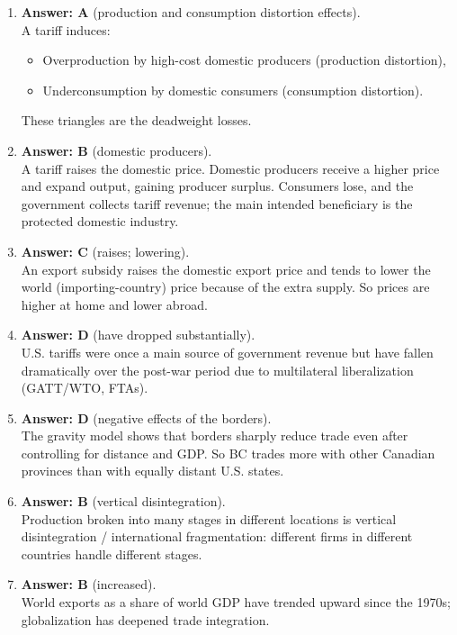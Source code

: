 \documentclass[12pt]{article}
\begin{document}
\begin{enumerate}[label=\textbf{\arabic*.}]
\item \textbf{Answer: A} (production and consumption distortion effects).\\
A tariff induces:
\begin{itemize}
\item Overproduction by high-cost domestic producers (production distortion),
\item Underconsumption by domestic consumers (consumption distortion).
\end{itemize}
These triangles are the deadweight losses.

\item \textbf{Answer: B} (domestic producers).\\
A tariff raises the domestic price. Domestic producers receive a higher price and expand output, gaining producer surplus. Consumers lose, and the government collects tariff revenue; the main intended beneficiary is the protected domestic industry.

\item \textbf{Answer: C} (raises; lowering).\\
An export subsidy raises the domestic export price and tends to lower the world (importing-country) price because of the extra supply. So prices are higher at home and lower abroad.

\item \textbf{Answer: D} (have dropped substantially).\\
U.S. tariffs were once a main source of government revenue but have fallen dramatically over the post-war period due to multilateral liberalization (GATT/WTO, FTAs).

\item \textbf{Answer: D} (negative effects of the borders).\\
The gravity model shows that borders sharply reduce trade even after controlling for distance and GDP. So BC trades more with other Canadian provinces than with equally distant U.S. states.

\item \textbf{Answer: B} (vertical disintegration).\\
Production broken into many stages in different locations is vertical disintegration / international fragmentation: different firms in different countries handle different stages.

\item \textbf{Answer: B} (increased).\\
World exports as a share of world GDP have trended upward since the 1970s; globalization has deepened trade integration.


\end{enumerate}
\end{document}
